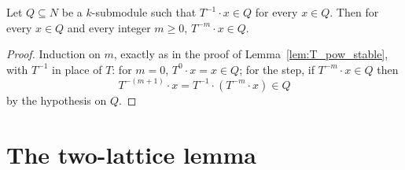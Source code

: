 \begin{lemma}
  \label{lem:T_inv_pow_stable}
  \leanok
  Let \(Q \subseteq N\) be a \(k\)-submodule such that \(T^{-1} \cdot x \in Q\) for every
  \(x \in Q\). Then for every \(x \in Q\) and every integer \(m \ge 0\),
  \(T^{-m} \cdot x \in Q\).
\end{lemma}
\begin{proof}
  \leanok
  Induction on \(m\), exactly as in the proof of Lemma~\ref{lem:T_pow_stable}, with \(T^{-1}\)
  in place of \(T\): for \(m = 0\), \(T^0 \cdot x = x \in Q\); for the step, if
  \(T^{-m} \cdot x \in Q\) then
  \[
    T^{-(m+1)} \cdot x = T^{-1} \cdot (T^{-m} \cdot x) \in Q
  \]
  by the hypothesis on \(Q\).
\end{proof}

\section{The two-lattice lemma}

